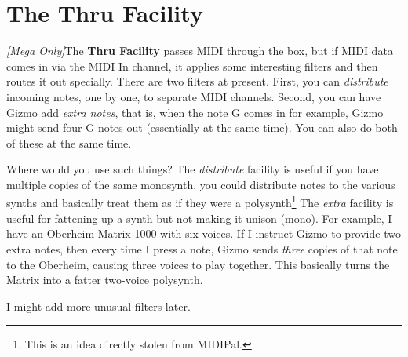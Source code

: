 \documentclass{article}
\begin{document}
\section{The Thru Facility}
\label{thru}

\textit{[Mega Only]}\qquad The {\bf Thru Facility} passes MIDI through the box, but if MIDI data comes in via the MIDI In channel, it applies some interesting filters and then routes it out specially.  There are two filters at present.  First, you can {\it distribute} incoming notes, one by one, to separate MIDI channels.  Second, you can have Gizmo add {\it extra notes}, that is, when the note G comes in for example, Gizmo might send four G notes out (essentially at the same time).  You can also do both of these at the same time.

Where would you use such things?  The {\it distribute} facility is useful if you have multiple copies of the same monosynth, you could distribute notes to the various synths and basically treat them as if they were a polysynth\footnote{This is an idea directly stolen from MIDIPal.}  The {\it extra} facility is useful for fattening up a synth but not making it unison (mono).  For example, I have an Oberheim Matrix 1000 with six voices.  If I instruct Gizmo to provide two extra notes, then every time I press a note, Gizmo sends {\it three} copies of that note to the Oberheim, causing three voices to play together.  This basically turns the Matrix into a fatter two-voice polysynth.

I might add more unusual filters later.
\end{document}
